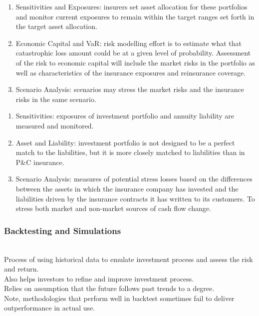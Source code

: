 \begin{remark} 
\begin{enumerate}[label=\roman*.]
\setlength{\itemsep}{0pt}
\item Sensitivities and Exposures: insurers set asset allocation for these portfolios and monitor current exposures to remain within the target ranges set forth in the target asset allocation.
\item Economic Capital and VaR: risk modelling effort is to estimate what that catastrophic loss amount could be at a given level of probability. Assessment of the risk to economic capital will include the market risks in the portfolio as well as characteristics of the insurance exposures and reinsurance coverage.
\item Scenario Analysis: scenarios may stress the market risks and the insurance risks in the same scenario.
\end{enumerate}
\end{remark}

\begin{remark} 
\begin{enumerate}[label=\roman*.]
\setlength{\itemsep}{0pt}
\item Sensitivities: exposures of investment portfolio and annuity liability are measured and monitored.
\item Asset and Liability: investment portfolio is not designed to be a perfect match to the liabilities, but it is more closely matched to liabilities than in P\&C insurance.
\item Scenario Analysis: measures of potential stress losses based on the differences between the assets in which the insurance company has invested and the liabilities driven by the insurance contracts it has written to its customers. To stress both market and non-market sources of cash flow change.
\end{enumerate}
\end{remark}

\subsubsection{Backtesting and Simulations}

\begin{remark} \\
Process of using historical data to emulate investment process and assess the risk and return.\\
Also helps investors to refine and improve investment process.\\
Relies on assumption that the future follows past trends to a degree.\\
Note, methodologies that perform well in backtest sometimes fail to deliver outperformance in actual use.
\end{remark}

